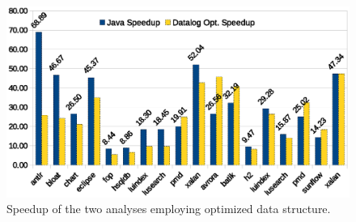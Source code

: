 \begin{figure}[h]
  \begin{minipage}[b]{\linewidth}
    \centering
    \includegraphics[clip,width=0.77\linewidth, height=0.4275\linewidth]{assets/must-data/speedup.eps}
  \end{minipage}
  \caption{Speedup of the two analyses employing optimized data structure.}
    \label{fig:speedup}
\end{figure}





